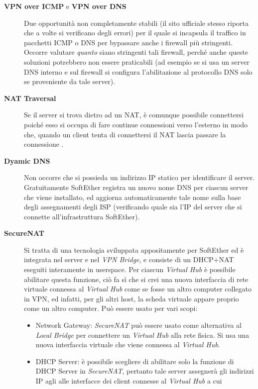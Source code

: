 \begin{description}
  \item[\textbf{VPN over ICMP} e \textbf{VPN over DNS}]Due opportunità non completamente stabili (il sito ufficiale stesso
  riporta che a volte si verificano degli errori) per il quale si incapsula il traffico in pacchetti ICMP
  o DNS per bypassare anche i firewall più stringenti. Occorre valutare \textit{quanto}
  siano stringenti tali firewall, perché anche queste soluzioni potrebbero non essere
  praticabili (ad esempio se si usa un server DNS interno e sul firewall si configura l'abilitazione
  al protocollo DNS solo se proveniente da tale server)\cite{softether-vpn-over-icmp}.
  \item[\textbf{NAT Traversal}]Se il server si trova dietro ad un NAT, è comunque possibile connettersi poiché
  esso si occupa di fare continue connessioni verso l'esterno in modo che, quando un client tenta di connettersi
  il NAT lascia passare la connessione \cite{softether-dynamic-dns-nat-trav}.
  \item[\textbf{Dyamic DNS}]Non occorre che si possieda un indirizzo IP statico per identificare il server.
  Gratuitamente SoftEther registra un nuovo nome DNS per ciascun server che viene installato, ed aggiorna
  automaticamente tale nome sulla base degli assegnamenti degli ISP (verificando quale sia l'IP
  del server che si connette all'infrastruttura SoftEther).
  \item[\textbf{SecureNAT}]Si tratta di una tecnologia sviluppata appositamente per SoftEther ed è integrata
  nel server e nel \textit{VPN Bridge}, e consiste di un DHCP+NAT eseguiti interamente in userspace\cite{softether-exploit-securenat}.
  Per ciascun \textit{Virtual Hub} è possibile abilitare questa funzione, ciò fa sì che si crei
  una nuova interfaccia di rete virtuale connessa al \textit{Virtual Hub}
  come se fosse un altro computer collegato in VPN, ed infatti, per gli altri host, la scheda virtuale appare proprio
  come un altro computer. Può essere usato per vari scopi:
  \begin{itemize}
    \item Network Gateway: \textit{SecureNAT} può essere usato come alternativa al \textit{Local Bridge} per
    connettere un \textit{Virtual Hub} alla rete fisica. Si usa una nuova interfaccia virtuale che viene connessa al \textit{Virtual Hub}.
    \item DHCP Server: è possibile scegliere di abilitare solo la funzione di DHCP Server in \textit{SecureNAT}, pertanto
    tale server assegnerà gli indirizzi IP agli alle interfacce dei client connesse al \textit{Virtual Hub} a cui

\end{itemize}
\end{description}
